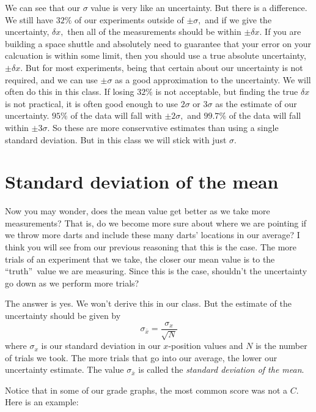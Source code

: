 \documentclass{book}%
\begin{document}
We can see that our $\sigma $ value is very like an uncertainty. But there
is a difference. We still have $32\%$ of our experiments outside of $\pm
\sigma ,$ and if we give the uncertainty, $\delta x,$ then all of the
measurements should be within $\pm \delta x.$ If you are building a space
shuttle and absolutely need to guarantee that your error on your calcuation
is within some limit, then you should use a true absolute uncertainty, $\pm
\delta x.$ But for most experiments, being that certain about our
uncertainty is not required, and we can use $\pm \sigma $ as a good
approximation to the uncertainty. We will often do this in this class. If
losing $32\%$ is not acceptable, but finding the true $\delta x$ is not
practical, it is often good enough to use $2\sigma $ or $3\sigma $ as the
estimate of our uncertainty. $95\%$ of the data will fall with $\pm 2\sigma
, $ and $99.7\%$ of the data will fall within $\pm 3\sigma .$ So these are
more conservative estimates than using a single standard deviation. But in
this class we will stick with just $\sigma .$

\section{Standard deviation of the mean}

Now you may wonder, does the mean value get better as we take more
measurements? That is, do we become more sure about where we are pointing if
we throw more darts and include these many darts' locations in our average?
I think you will see from our previous reasoning that this is the case. The
more trials of an experiment that we take, the closer our mean value is to
the \textquotedblleft truth\textquotedblright\ value we are measuring. Since
this is the case, shouldn't the uncertainty go down as we perform more
trials?

The answer is yes. We won't derive this in our class. But the estimate of
the uncertainty should be given by 
\[
\sigma _{\bar{x}}=\frac{\sigma _{x}}{\sqrt{N}} 
\]%
where $\sigma _{x}$ is our standard deviation in our $x$-position values and 
$N$ is the number of trials we took. The more trials that go into our
average, the lower our uncertainty estimate. The value $\sigma _{\bar{x}}$
is called the \emph{standard deviation of the mean}.

Notice that in some of our grade graphs, the most common score was not a $C.$
Here is an example: 
\end{document}
